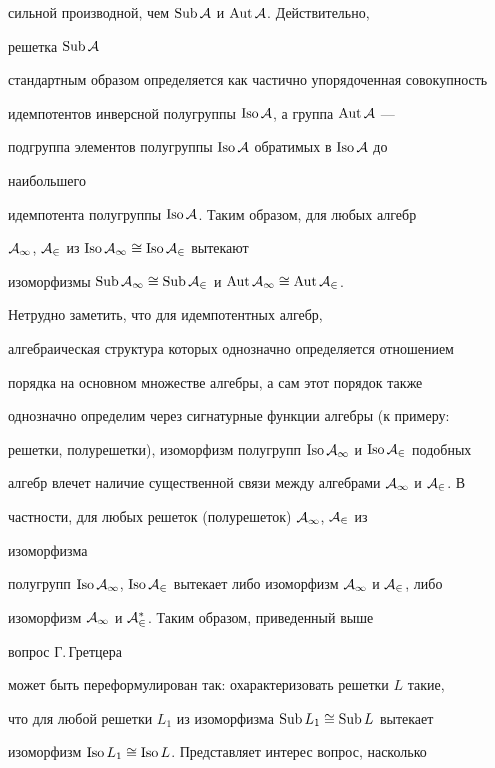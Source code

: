 сильной производной, чем $\operatorname{Sub}\cal A$ и $\operatorname{Aut}\cal A$. Действительно, 


решетка $\operatorname{Sub}\cal A$ 


стандартным образом определяется как частично упорядоченная совокупность 


идемпотентов инверсной полугруппы $\operatorname{Iso}\cal A$, а группа $\operatorname{Aut}\cal A$ --- 


подгруппа элементов полугруппы $\operatorname{Iso}\cal A$ обратимых в $\operatorname{Iso}\cal A$ до 


наибольшего 


идемпотента полугруппы $\operatorname{Iso}\cal A$. Таким образом, для любых алгебр 


$\cal A_1$, $\cal A_2$ из $\operatorname{Iso}\cal A_1\cong\operatorname{Iso}\cal A_2$ вытекают 


изоморфизмы $\Sub\cal A_1\cong\Sub\cal A_2$ и $\Aut\cal 


A_1\cong\Aut\cal A_2$. 


 


Нетрудно заметить, что для идемпотентных алгебр, 


алгебраическая структура которых однозначно определяется отношением 


порядка на основном множестве алгебры, а сам этот порядок также 


однозначно определим через сигнатурные функции алгебры (к примеру: 


решетки, полурешетки), изоморфизм полугрупп $\Iso\cal A_1$ и $\Iso\cal 


A_2$ подобных 


алгебр влечет наличие существенной связи между алгебрами $\cal A_1$ и $\cal 


A_2$. В 


частности, для любых решеток (полурешеток) $\cal A_1$, $\cal A_2$ из 


изоморфизма 


полугрупп $\Iso\cal A_1$, $\Iso\cal A_2$ вытекает либо изоморфизм $\cal 


A_1$ и $\cal A_2$, либо 


изоморфизм $\cal A_1$ и $\cal A^*_2$. Таким образом, приведенный выше 


вопрос Г.\,Гретцера 


может быть переформулирован так: охарактеризовать решетки $L$ такие, 


что для любой решетки $L_1$ из изоморфизма $\operatorname{Sub} L_1\cong\operatorname{Sub} L$ вытекает 


изоморфизм $\operatorname{Iso} L_1\cong\operatorname{Iso} L$. Представляет интерес вопрос, насколько 


